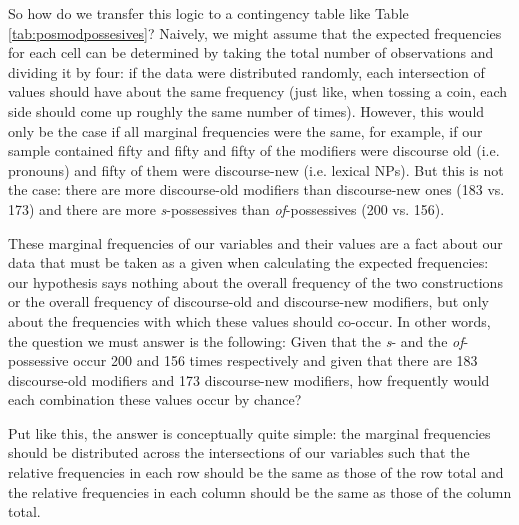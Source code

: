 So how do we transfer this logic to a contingency table like Table \ref{tab:posmodpossesives}? Naively, we might assume that the expected frequencies for each cell can be determined by taking the total number of observations and dividing it by four: if the data were distributed randomly, each intersection of values should have about the same frequency (just like, when tossing a coin, each side should come up roughly the same number of times). However, this would only be the case if all marginal frequencies were the same, for example, if our sample contained fifty  and fifty  and fifty of the modifiers were discourse old (i.e. pronouns) and fifty of them were discourse-new (i.e. lexical NPs). But this is not the case: there are more discourse-old modifiers than discourse-new ones (183 vs. 173) and there are more \textit{s}-possessives than \textit{of}-possessives (200 vs. 156).

These marginal frequencies of our variables and their values are a fact about our data that must be taken as a given when calculating the expected frequencies: our hypothesis says nothing about the overall frequency of the two constructions or the overall frequency of discourse-old and discourse-new modifiers, but only about the frequencies with which these values should co-occur. In other words, the question we must answer is the following: Given that the \textit{s}- and the \textit{of}-possessive occur 200 and 156 times respectively and given that there are 183 discourse-old modifiers and 173 discourse-new modifiers, how frequently would each combination these values occur by chance?

Put like this, the answer is conceptually quite simple: the marginal frequencies should be distributed across the intersections of our variables such that the relative frequencies in each row should be the same as those of the row total and the relative frequencies in each column should be the same as those of the column total.

